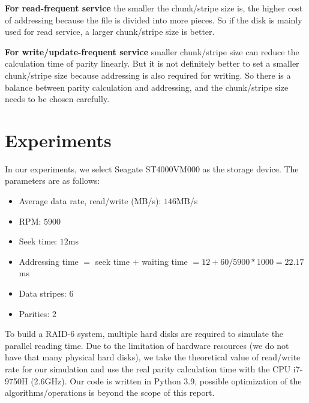 \documentclass[journal]{IEEEtran}
\begin{document}
\textbf{For read-frequent service} the smaller the chunk/stripe size is, the higher cost of addressing because the file is divided into more pieces. So if the disk is mainly used for read service, a larger chunk/stripe size is better.

\textbf{For write/update-frequent service} smaller chunk/stripe size can reduce the calculation time of parity linearly. But it is not definitely better to set a smaller chunk/stripe size because addressing is also required for writing. So there is a balance between parity calculation and addressing, and the chunk/stripe size needs to be chosen carefully. 

\section{Experiments}
In our experiments, we select Seagate ST4000VM000 as the storage device. The parameters are as follows: 
\begin{itemize}
    \item Average data rate, read/write (MB/s): $146$MB/s
    \item RPM: $5900$
    \item Seek time: $12$ms
    \item Addressing time $=$ seek time $+$ waiting time $= 12+60/5900*1000=22.17$ms
    \item Data stripes: 6
    \item Parities: 2
\end{itemize}

To build a RAID-6 system, multiple hard disks are required to simulate the parallel reading time. Due to the limitation of hardware resources (we do not have that many physical hard disks), we take the theoretical value of read/write rate for our simulation and use the real parity calculation time with the CPU i7-9750H (2.6GHz). Our code is written in Python 3.9, possible optimization of the algorithms/operations is beyond the scope of this report.
\end{document}

